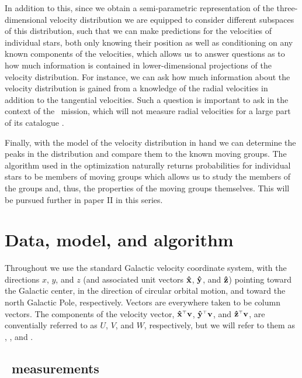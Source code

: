 In addition to this, since we obtain a semi-parametric representation
of the three-dimensional velocity distribution we are equipped to
consider different subspaces of this distribution, such that we can
make predictions for the velocities of individual stars, both only
knowing their position as well as conditioning on any known components
of the velocities, which allows us to answer questions as to how much
information is contained in lower-dimensional projections of the
velocity distribution. For instance, we can ask how much information
about the velocity distribution is gained from a knowledge of the
radial velocities in addition to the tangential velocities. Such a
question is important to ask in the context of the \Gaia\ mission,
which will not measure radial velocities for a large part of its
catalogue \citep{2001A&A...369..339P}.

Finally, with the model of the velocity distribution in hand we can
determine the peaks in the distribution and compare them to the known
moving groups. The algorithm used in the optimization naturally
returns probabilities for individual stars to be members of moving
groups which allows us to study the members of the groups and, thus,
the properties of the moving groups themselves. This will be pursued
further in paper II in this series.



\section{Data, model, and algorithm}\label{sec:model}

Throughout we use the standard Galactic velocity coordinate system,
with the directions $x$, $y$, and $z$ (and associated unit vectors
$\mathbf{\hat{x}}$, $\mathbf{\hat{y}}$, and $\mathbf{\hat{z}}$) pointing toward the Galactic center, in
the direction of circular orbital motion, and toward the north
Galactic Pole, respectively. Vectors are everywhere taken to be column
vectors. The components of the velocity vector, $\mathbf{\hat{x}}^{\scriptscriptstyle \top}\boldsymbol{\mathbf{v}}$,
$\mathbf{\hat{y}}^{\scriptscriptstyle \top}\boldsymbol{\mathbf{v}}$, and $\mathbf{\hat{z}}^{\scriptscriptstyle \top}\boldsymbol{\mathbf{v}}$, are conventially referred to as $U$,
$V$, and $W$, respectively, but we will refer to them as \vx, \vy, and
\vz.

\subsection{\Hipparcos\ measurements}

